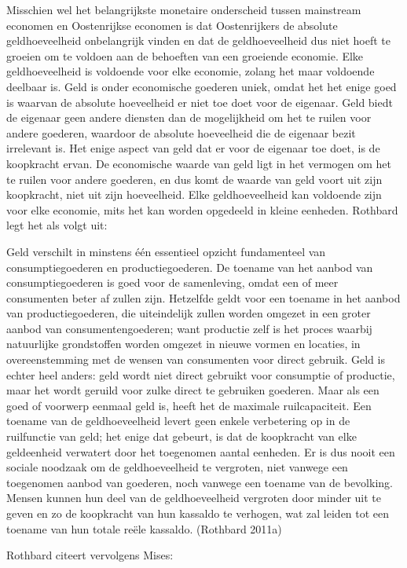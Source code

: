 \documentclass[
  a5paper,
  smalldemyvopaper,11pt,twoside,onecolumn,openright,extrafontsizes,
hidelinks]{memoir}
\begin{document}
Misschien wel het belangrijkste monetaire onderscheid tussen mainstream
economen en Oostenrijkse economen is dat Oostenrijkers de absolute
geldhoeveelheid onbelangrijk vinden en dat de geldhoeveelheid dus niet
hoeft te groeien om te voldoen aan de behoeften van een groeiende
economie. Elke geldhoeveelheid is voldoende voor elke economie, zolang
het maar voldoende deelbaar is. Geld is onder economische goederen
uniek, omdat het het enige goed is waarvan de absolute hoeveelheid er
niet toe doet voor de eigenaar. Geld biedt de eigenaar geen andere
diensten dan de mogelijkheid om het te ruilen voor andere goederen,
waardoor de absolute hoeveelheid die de eigenaar bezit irrelevant is.
Het enige aspect van geld dat er voor de eigenaar toe doet, is de
koopkracht ervan. De economische waarde van geld ligt in het vermogen om
het te ruilen voor andere goederen, en dus komt de waarde van geld voort
uit zijn koopkracht, niet uit zijn hoeveelheid. Elke geldhoeveelheid kan
voldoende zijn voor elke economie, mits het kan worden opgedeeld in
kleine eenheden. Rothbard legt het als volgt uit:

Geld verschilt in minstens één essentieel opzicht fundamenteel van
consumptiegoederen en productiegoederen. De toename van het aanbod van
consumptiegoederen is goed voor de samenleving, omdat een of meer
consumenten beter af zullen zijn. Hetzelfde geldt voor een toename in
het aanbod van productiegoederen, die uiteindelijk zullen worden omgezet
in een groter aanbod van consumentengoederen; want productie zelf is het
proces waarbij natuurlijke grondstoffen worden omgezet in nieuwe vormen
en locaties, in overeenstemming met de wensen van consumenten voor
direct gebruik. Geld is echter heel anders: geld wordt niet direct
gebruikt voor consumptie of productie, maar het wordt geruild voor zulke
direct te gebruiken goederen. Maar als een goed of voorwerp eenmaal geld
is, heeft het de maximale ruilcapaciteit. Een toename van de
geldhoeveelheid levert geen enkele verbetering op in de ruilfunctie van
geld; het enige dat gebeurt, is dat de koopkracht van elke geldeenheid
verwatert door het toegenomen aantal eenheden. Er is dus nooit een
sociale noodzaak om de geldhoeveelheid te vergroten, niet vanwege een
toegenomen aanbod van goederen, noch vanwege een toename van de
bevolking. Mensen kunnen hun deel van de geldhoeveelheid vergroten door
minder uit te geven en zo de koopkracht van hun kassaldo te verhogen,
wat zal leiden tot een toename van hun totale reële kassaldo. (Rothbard
2011a)

Rothbard citeert vervolgens Mises:
\end{document}
